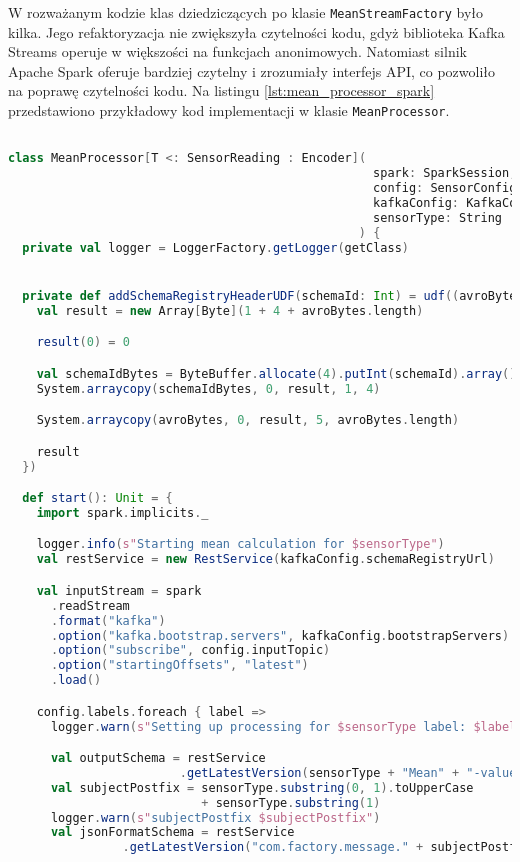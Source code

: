 W rozważanym kodzie klas dziedziczących po klasie \texttt{MeanStreamFactory} było kilka. Jego refaktoryzacja nie zwiększyła czytelności kodu, gdyż biblioteka Kafka Streams \cite{kafka_streams} operuje w większości na funkcjach anonimowych. Natomiast silnik Apache Spark oferuje bardziej czytelny i zrozumiały interfejs API, co pozwoliło na poprawę czytelności kodu. Na listingu \ref{lst:mean_processor_spark} przedstawiono przykładowy kod implementacji w klasie \texttt{MeanProcessor}.

\begin{lstlisting}[caption={Implementacja w klasie MeanProcessor za pomocą Apache Spark}, label={lst:mean_processor_spark},language=Scala]

class MeanProcessor[T <: SensorReading : Encoder](
                                                   spark: SparkSession,
                                                   config: SensorConfig,
                                                   kafkaConfig: KafkaConfig,
                                                   sensorType: String
                                                 ) {
  private val logger = LoggerFactory.getLogger(getClass)


  private def addSchemaRegistryHeaderUDF(schemaId: Int) = udf((avroBytes: Array[Byte]) => {
    val result = new Array[Byte](1 + 4 + avroBytes.length)

    result(0) = 0

    val schemaIdBytes = ByteBuffer.allocate(4).putInt(schemaId).array()
    System.arraycopy(schemaIdBytes, 0, result, 1, 4)

    System.arraycopy(avroBytes, 0, result, 5, avroBytes.length)

    result
  })

  def start(): Unit = {
    import spark.implicits._

    logger.info(s"Starting mean calculation for $sensorType")
    val restService = new RestService(kafkaConfig.schemaRegistryUrl)

    val inputStream = spark
      .readStream
      .format("kafka")
      .option("kafka.bootstrap.servers", kafkaConfig.bootstrapServers)
      .option("subscribe", config.inputTopic)
      .option("startingOffsets", "latest")
      .load()

    config.labels.foreach { label =>
      logger.warn(s"Setting up processing for $sensorType label: $label")

      val outputSchema = restService
                        .getLatestVersion(sensorType + "Mean" + "-value")
      val subjectPostfix = sensorType.substring(0, 1).toUpperCase 
                           + sensorType.substring(1)
      logger.warn(s"subjectPostfix $subjectPostfix")
      val jsonFormatSchema = restService
                .getLatestVersion("com.factory.message." + subjectPostfix)


\end{lstlisting}
